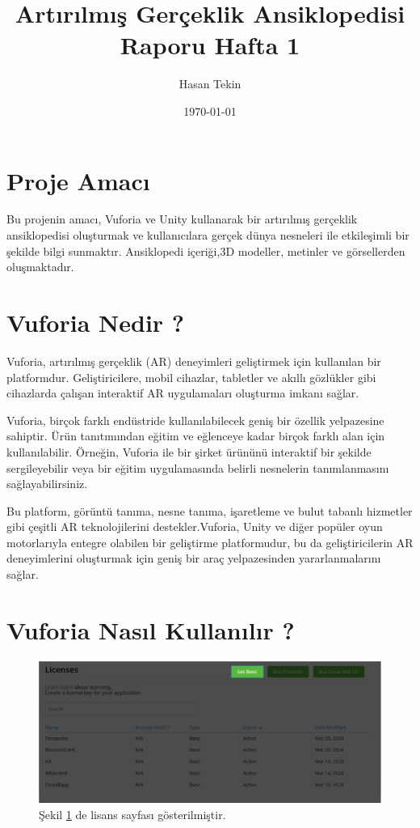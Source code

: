 \documentclass[12pt, a4paper]{article}
\title{Artırılmış Gerçeklik Ansiklopedisi Raporu Hafta 1 }
\author{Hasan Tekin}
\date{\today}
\begin{document}
	\maketitle
	
	
	
	\section{Proje Amacı}
	Bu projenin amacı, Vuforia ve Unity kullanarak bir artırılmış gerçeklik ansiklopedisi oluşturmak ve kullanıcılara gerçek dünya nesneleri ile etkileşimli bir şekilde bilgi sunmaktır. Ansiklopedi içeriği,3D modeller, metinler ve görsellerden oluşmaktadır.
	\section{Vuforia Nedir ?}
	
	Vuforia, artırılmış gerçeklik (AR) deneyimleri geliştirmek için kullanılan bir platformdur. Geliştiricilere, mobil cihazlar, tabletler ve akıllı gözlükler gibi cihazlarda çalışan interaktif AR uygulamaları oluşturma imkanı sağlar.
	
	Vuforia, birçok farklı endüstride kullanılabilecek geniş bir özellik yelpazesine sahiptir. Ürün tanıtımından eğitim ve eğlenceye kadar birçok farklı alan için kullanılabilir. Örneğin, Vuforia ile bir şirket ürününü interaktif bir şekilde sergileyebilir veya bir eğitim uygulamasında belirli nesnelerin tanımlanmasını sağlayabilirsiniz.
	
	Bu platform, görüntü tanıma, nesne tanıma, işaretleme ve bulut tabanlı hizmetler gibi çeşitli AR teknolojilerini destekler.Vuforia, Unity ve diğer popüler oyun motorlarıyla entegre olabilen bir geliştirme platformudur, bu da geliştiricilerin AR deneyimlerini oluşturmak için geniş bir araç yelpazesinden yararlanmalarını sağlar.\cite{Vuforia}
	
	
	\section{Vuforia Nasıl Kullanılır ?}
	
	\newpage
	\begin{figure}[!ht]
		\caption{}
		\centering
		\includegraphics[angle=0, width=\textwidth]{Vuforia2.PNG}
		\label{gantt}
		Şekil \ref{gantt} de lisans sayfası gösterilmiştir.\cite{Vuforia}	
		
		
		
	\end{figure}
	
\end{document}
